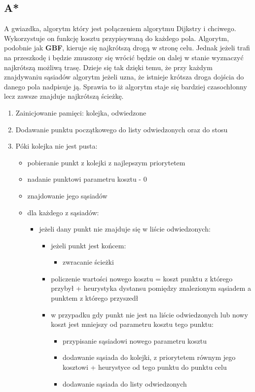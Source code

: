 \documentclass{article}
\begin{document}
\subsection{A*}
A gwiazdka, algorytm który jest połączeniem algorytmu Dijkstry i chciwego. Wykorzystuje on funkcję kosztu przypisywaną do każdego pola. Algorytm, podobnie jak \textbf{GBF}, kieruje się najkrótszą drogą w stronę celu. Jednak jeżeli trafi na przeszkodę i będzie zmuszony się wrócić będzie on dalej w stanie wyznaczyć najkrótszą możliwą trasę. Dzieje się tak dzięki temu, że przy każdym znajdywaniu sąsiadów algorytm jeżeli uzna, że istnieje krótsza droga dojścia do danego pola nadpisuje ją. Sprawia to iż algorytm staje się bardziej czasochłonny lecz zawsze znajduje najkrótszą ścieżkę.  
\begin{enumerate}
\item Zainicjowanie pamięci: kolejka, odwiedzone
\item Dodawanie punktu początkowego do listy odwiedzonych oraz do stosu
\item Póki kolejka nie jest pusta:
	\begin{itemize}
	\item pobieranie punkt z kolejki z najlepszym priorytetem
	\item nadanie punktowi parametru kosztu - 0
	\item znajdowanie jego sąsiadów
	\item dla każdego z sąsiadów:
	\begin{itemize}
		\item jeżeli dany punkt nie znajduje się w liście odwiedzonych:
			\begin{itemize}
			\item jeżeli punkt jest końcem:
				\begin{itemize}
				\item zwracanie ścieżki
				\end{itemize}
			\item policzenie wartości nowego kosztu = koszt punktu z którego przybył + heurystyka dystansu pomiędzy znalezionym sąsiadem a punktem z którego przyszedł
			\item w przypadku gdy punkt nie jest na liście odwiedzonych lub nowy koszt jest mniejszy od parametru kosztu tego punktu:
				\begin{itemize}
				\item przypisanie sąsiadowi nowego parametru kosztu
				\item dodawanie sąsiada do kolejki, z priorytetem równym jego kosztowi + heurystyce od tego punktu do punktu celu
				\item dodawanie sąsiada do listy odwiedzonych				
				\end{itemize}
			\end{itemize}
		\end{itemize}		
	\end{itemize}
\end{enumerate}
\end{document}
